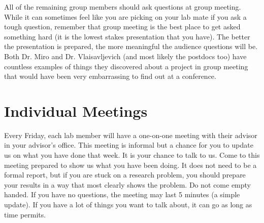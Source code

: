 \documentclass[letterpaper]{article}
\begin{document}
All of the remaining group members should ask questions at group meeting. While it can sometimes feel like you are picking on your lab mate if you ask a tough question, remember that group meeting is the best place to get asked something hard (it is the lowest stakes presentation that you have). The better the presentation is prepared, the more meaningful the audience questions will be. Both Dr. Miro and Dr. Vlaisavljevich (and most likely the postdocs too) have countless examples of things they discovered about a project in group meeting that would have been very embarrassing to find out at a conference.  %

\section*{Individual Meetings}
Every Friday, each lab member will have a one-on-one meeting with their advisor in your advisor's office. This meeting is informal but a chance for you to update us on what you have done that week. It is your chance to talk to us. Come to this meeting prepared to show us what you have been doing. It does not need to be a formal report, but if you are stuck on a research problem, you should prepare your results in a way that most clearly shows the problem. Do not come empty handed. If you have no questions, the meeting may last 5 minutes (a simple update). If you have a lot of things you want to talk about, it can go as long as time permits.
\end{document}
